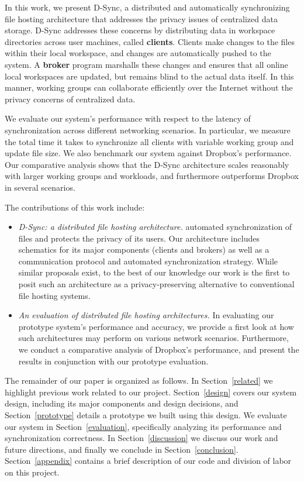 In this work, we present D-Sync, a distributed and automatically synchronizing file hosting
architecture that addresses the privacy issues of centralized data storage.
D-Sync addresses these concerns
by distributing data in workspace directories across user machines, called \textbf{clients}.
Clients make changes to the files within their local workspace,
and changes are automatically pushed to the system.
A \textbf{broker} program marshalls these changes and ensures that all online local workspaces are updated,
but remains blind to the actual data itself.
In this manner, working groups can collaborate efficiently over the Internet
without the privacy concerns of centralized data.

We evaluate our system's performance with respect to the latency
of synchronization across different networking scenarios.
In particular, we measure the total time it takes to synchronize
all clients with variable working group and update file size.
We also benchmark our system against Dropbox's performance.
Our comparative analysis shows that the D-Sync architecture
scales reasonably with larger working groups and workloads,
and furthermore outperforms Dropbox in several scenarios.

The contributions of this work include:
\begin{itemize}
\item \emph{D-Sync: a distributed file hosting architecture.} 
automated synchronization of files and protects the privacy of its users.
Our architecture includes schematics for its major components (clients and brokers) as well as a communication protocol and automated synchronization strategy.
While similar proposals exist, to the best of our knowledge 
our work is the first to posit such an architecture as a privacy-preserving alternative to conventional file hosting systems.
\item \emph{An evaluation of distributed file hosting architectures.}
In evaluating our prototype system's performance and accuracy,
we provide a first look at how such architectures may perform
on various network scenarios.
Furthermore, we conduct a comparative analysis of Dropbox's
performance, and present the results in conjunction with our prototype evaluation.
\end{itemize}

The remainder of our paper is organized as follows.
In Section~\ref{related} we highlight previous work related to our project.
Section~\ref{design} covers our system design, including
its major components and design decisions,
and Section~\ref{prototype} details a prototype we built using this design.
We evaluate our system in Section~\ref{evaluation}, specifically
analyzing its performance and synchronization correctness.
In Section~\ref{discussion} we discuss our work and future directions,
and finally we conclude in Section~\ref{conclusion}.
Section~\ref{appendix} contains a brief description
of our code and division of labor on this project.

